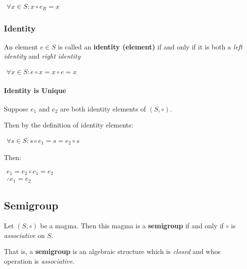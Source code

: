 \begin{math}
  \begin{array}{c}
    \forall x \in S: x \circ e_R = x
  \end{array}
\end{math}


\subsubsection{Identity}
An element $e \in S$ is called an \textbf{identity (element)} if and
only if it is both a \textit{left identity} and \textit{right
  identity}

\begin{math}
  \begin{array}{c}
    \forall x \in S: e \circ x = x \circ e =  x
  \end{array}
\end{math}


\paragraph{Identity is Unique}

Suppose $e_1$ and $e_2$ are both identity elements of $(S, \circ)$.

Then by the definition of identity elements:

\begin{math}
  \begin{array}{c}
    \forall s \in S: s \circ e_1 = s = e_2 \circ s
  \end{array}
\end{math}

Then:

\begin{math}
  \begin{array}{c}
    e_1 = e_2 \circ e_1 = e_2 \\
    \therefore e_1 = e_2
  \end{array}
\end{math}



\subsection{Semigroup}
\label{sec:semigroup}

Let $(S, \circ)$ be a magma. Then this magma is a \textbf{semigroup}
if and only if $\circ$ is \textit{associative} on $S$.


That is, a \textbf{semigroup} is an algebraic structure which is
\textit{closed} and whos operation is \textit{associative}.


